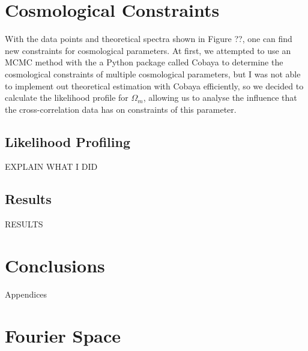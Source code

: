 \documentclass[openany,a4paper,12pt,oneside]{book}
\begin{document}
\begin{spacing}{1.5}
\chapter{Cosmological Constraints}\label{chapter:constraints}

With the data points and theoretical spectra shown in Figure ??, one can find new constraints for cosmological parameters. At first, we attempted to use an MCMC method with the a Python package called Cobaya\cite{CobayaASCL, Cobaya_preprint} to determine the cosmological constraints of multiple cosmological parameters, but I was not able to implement out theoretical estimation with Cobaya efficiently, so we decided to calculate the likelihood profile for $\Omega_m$, allowing us to analyse the influence that the cross-correlation data has on constraints of this parameter.



\section{Likelihood Profiling}

EXPLAIN WHAT I DID 

\section{Results}

RESULTS

\chapter{Conclusions}

\appendix

\newpage

\begin{center}
\thispagestyle{empty}
\vspace*{\fill}
\Huge{Appendices}
\vspace*{\fill}
\end{center}

\iffalse %
\chapter{Fourier Space}\label{appendix:FourierSpace}


\end{spacing}
\end{document}
